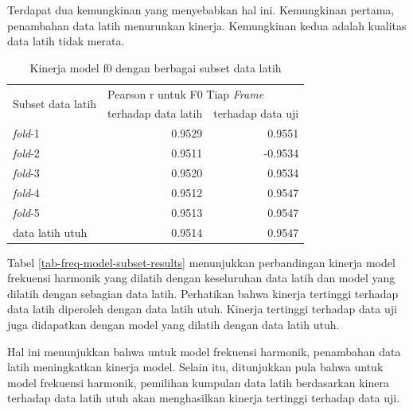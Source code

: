Terdapat dua kemungkinan yang menyebabkan hal ini. Kemungkinan pertama, penambahan data latih menurunkan kinerja. Kemungkinan kedua adalah kualitas data latih tidak merata.

\begin{table}[htbp]
    \centering
    \caption{Kinerja model f0 dengan berbagai subset data latih}\label{tab-f0-model-subset-results}
    \begin{tabular}{ |l|r|r| } 
     \hline
     \multirow{2}{*}{Subset data latih} & \multicolumn{2}{l|}{Pearson r untuk F0 Tiap \textit{Frame}} \\
     \cline{2-3}
     & terhadap data latih & terhadap data uji \\\hline
	\textit{fold}-1          &0.9529  & 0.9551\\\hline
	\textit{fold}-2          &0.9511  &-0.9534\\\hline
	\textit{fold}-3          &0.9520  &0.9534\\\hline
	\textit{fold}-4          &0.9512  &0.9547\\\hline
	\textit{fold}-5          &0.9513  &0.9547\\\hline
	data latih utuh			 &0.9514  &0.9547\\\hline
    \end{tabular}
\end{table}

Tabel \ref{tab-freq-model-subset-results} menunjukkan  perbandingan kinerja model frekuensi harmonik yang dilatih dengan keseluruhan data latih dan model yang dilatih dengan sebagian data latih. Perhatikan bahwa kinerja tertinggi terhadap data latih diperoleh dengan data latih utuh. Kinerja tertinggi terhadap data uji juga didapatkan dengan model yang dilatih dengan data latih utuh. 

Hal ini menunjukkan bahwa untuk model frekuensi harmonik, penambahan data latih meningkatkan kinerja model. Selain itu, ditunjukkan pula bahwa untuk model frekuensi harmonik, pemilihan kumpulan data latih berdasarkan kinera terhadap data latih utuh akan menghasilkan kinerja tertinggi terhadap data uji.

